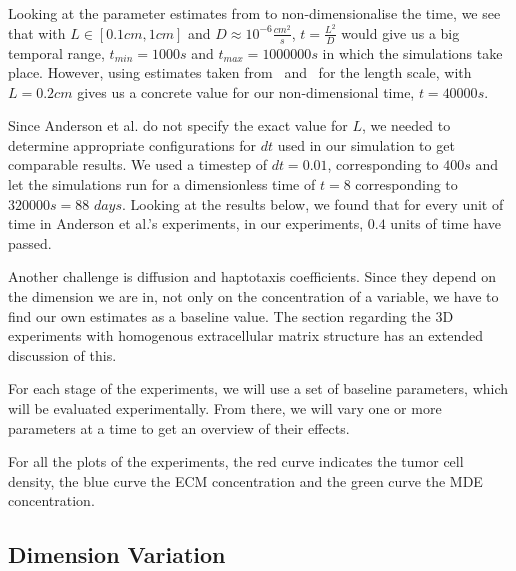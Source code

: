 Looking at the parameter estimates from \cite{anderson_mathematical_2000} to non-dimensionalise the time, we see that with $L \in [0.1cm,1cm]$ and $D\approx 10^{-6}\frac{cm^2}{s}$, $t = \frac{L^2}{D}$ would give us a big temporal range, $t_{min} = 1000s$ and $t_{max} = 1000000s$ in which the simulations take place. However, using estimates taken from~\cite{STEPHANOU200696} and~\cite{franssen_mathematical_2019} for the length scale, with $L=0.2cm$ gives us a concrete value for our non-dimensional time, $t=40000s$.

Since Anderson et al. do not specify the exact value for $L$, we needed to determine appropriate configurations for $dt$ used in our simulation to get comparable results. We used a timestep of $dt=0.01$, corresponding to $400s$ and let the simulations run for a dimensionless time of $t=8$ corresponding to $320000s=88$ $days$. Looking at the results below, we found that for every unit of time in Anderson et al.'s experiments, in our experiments, $0.4$ units of time have passed.

Another challenge is diffusion and haptotaxis coefficients. Since they depend on the dimension we are in, not only on the concentration of a variable, we have to find our own estimates as a baseline value. The section regarding the 3D experiments with homogenous extracellular matrix structure has an extended discussion of this.

For each stage of the experiments, we will use a set of baseline parameters, which will be evaluated experimentally. From there, we will vary one or more parameters at a time to get an overview of their effects. 

For all the plots of the experiments, the red curve indicates the tumor cell density, the blue curve the ECM concentration and the green curve the MDE concentration.  

\subsection{Dimension Variation}


